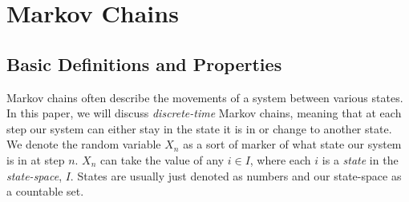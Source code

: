 \section{Markov Chains}
\subsection{Basic Definitions and Properties}

Markov chains often describe the movements of a system between various states. In this paper, we will discuss \emph{discrete-time} Markov chains, meaning that at each step our system can either stay in the state it is in or change to another state. We denote the random variable $X_n$ as a sort of marker of what state our system is in at step $n$. $X_n$ can take the value of any $i \in I$, where each $i$ is a \emph{state} in the \emph{state-space}, $I$. States are usually just denoted as numbers and our state-space as a countable set.

